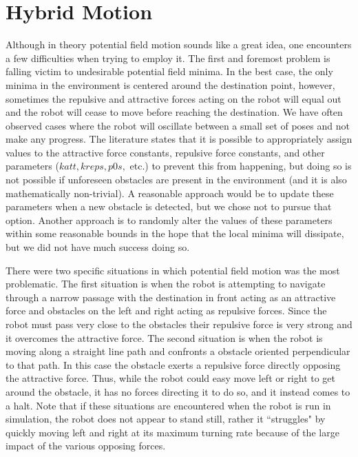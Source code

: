 \documentclass[12pt]{article}
\begin{document}
\section{Hybrid Motion}
\label{sec:robotmotion}

Although in theory potential field motion sounds like a great idea, one encounters a few difficulties when trying to employ it. The first and foremost problem is falling victim to undesirable potential field minima. In the best case, the only minima in the environment is centered around the destination point, however, sometimes the repulsive and attractive forces acting on the robot will equal out and the robot will cease to move before reaching the destination. We have often observed cases where the robot will oscillate between a small set of poses and not make any progress. The literature states that it is possible to appropriately assign values to the attractive force constants, repulsive force constants, and other parameters ($katt, kreps, p0s,$ etc.) to prevent this from happening, but doing so is not possible if unforeseen obstacles are present in the environment (and it is also mathematically non-trivial). A reasonable approach would be to update these parameters when a new obstacle is detected, but we chose not to pursue that option. Another approach is to randomly alter the values of these parameters within some reasonable bounds in the hope that the local minima will dissipate, but we did not have much success doing so.

There were two specific situations in which potential field motion was the most problematic. The first situation is when the robot is attempting to navigate through a narrow passage with the destination in front acting as an attractive force and obstacles on the left and right acting as repulsive forces. Since the robot must pass very close to the obstacles their repulsive force is very strong and it overcomes the attractive force. The second situation is when the robot is moving along a straight line path and confronts a obstacle oriented perpendicular to that path. In this case the obstacle exerts a repulsive force directly opposing the attractive force. Thus, while the robot could easy move left or right to get around the obstacle, it has no forces directing it to do so, and it instead comes to a halt. Note that if these situations are encountered when the robot is run in simulation, the robot does not appear to stand still, rather it ``struggles" by quickly moving left and right at its maximum turning rate because of the large impact of the various opposing forces.
\end{document}
